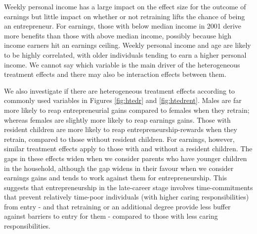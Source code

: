 \documentclass[12pt, a4paper]{article}
\begin{document}
Weekly personal income has a large impact on the effect size for the outcome of earnings but little impact on whether or not retraining lifts the chance of being an entrepreneur. For earnings, those with below median income in 2001 derive more benefits than those with above median income, possibly because high income earners hit an earnings ceiling. Weekly personal income and age are likely to be highly correlated, with older individuals tending to earn a higher personal income. We cannot say which variable is the main driver of the
heterogeneous treatment effects and there may also be interaction effects between them.

We also investigate if there are heterogeneous treatment effects according to
commonly used variables in Figures \ref{fig:htedr} and \ref{fig:htedrent}. Males are far more likely to reap entrepreneurial gains compared to females when they retrain; whereas females are slightly more likely to reap earnings gains.
Those with resident children are more likely to reap entrepreneurship-rewards when they retrain, compared to those without resident children. For earnings, however, similar treatment effects apply to those with and without a resident children. The gaps in these effects widen when we consider parents who have younger children in the household, although the gap widens in their favour when we consider earnings gains and tends to work against them for entrepreneurship. This suggests that entrepreneurship in the late-career stage involves time-commitments that prevent relatively time-poor individuals (with higher caring responsibilities) from entry - and that retraining or an additional degree provide less buffer against barriers to entry for them - compared to those with less caring responsibilities.
%
\
\end{document}
